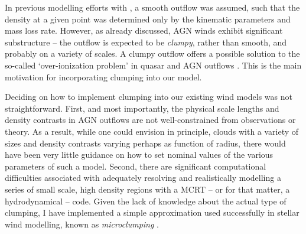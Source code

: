 In previous modelling efforts with \py, a smooth outflow was assumed, 
such that the density at a given point was determined only by the 
kinematic parameters and mass loss rate. However, as already discussed,
AGN winds exhibit significant substructure -- the outflow is expected to be
{\em clumpy}, rather than smooth, and probably on a variety of scales. 
A clumpy outflow offers a possible solution to the so-called `over-ionization problem' in 
quasar and AGN outflows \citep[e.g.][]{junk1983,weymann1985,hamann2013}. 
This is the main motivation for incorporating clumping into our model.

Deciding on how to implement clumping into our existing wind models was not straightforward.
First, and most importantly, the physical scale lengths and density contrasts in AGN outflows are not well-constrained from observations or theory.  As a result, while one could envision in principle, clouds with a variety of sizes and density contrasts varying perhaps as function of radius, there would have been very little guidance on how to set nominal values of the various parameters of such a model.
Second, there are significant computational difficulties associated with adequately resolving and realistically modelling a series of small scale, high density regions with a MCRT
-- or for that matter, a hydrodynamical -- code. 
Given the lack of knowledge about the actual type of clumping, I have implemented
a simple approximation used successfully in stellar wind modelling, known as 
{\em microclumping} \citep[e.g.][]{hamann1998,hilliermiller1999,hamann2008}.  

